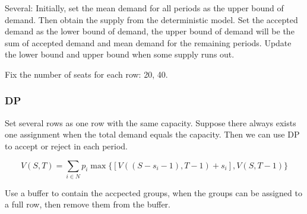 Several: Initially, set the mean demand for all periods as the upper bound of demand. Then obtain the supply from the deterministic model. Set the accepted demand as the lower bound of demand, the upper bound of demand will be the sum of accepted demand and mean demand for the remaining periods. Update the lower bound and upper bound when some supply runs out.



Fix the number of seats for each row: 20, 40.


\subsubsection*{DP}
Set several rows as one row with the same capacity.
Suppose there always exists one assignment when the total demand equals the capacity.
Then we can use DP to accept or reject in each period.

$$V(S,T) = \sum_{i \in N} p_i \max\{ {[V((S-s_i-1),T-1)+ s_i]}, {V(S,T-1)}\}$$

Use a buffer to contain the accpected groups, when the groups can be assigned to a full row, then remove them from the buffer.

